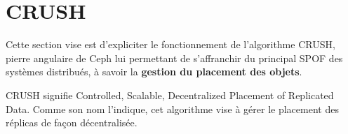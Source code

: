 \chapter{CRUSH}
\label{chap3:sec_crush}

Cette section vise est d'expliciter le fonctionnement de l'algorithme CRUSH, pierre angulaire de Ceph lui permettant de s'affranchir du principal SPOF des systèmes distribués, à savoir la \textbf{gestion du placement des objets}.

CRUSH signifie Controlled, Scalable, Decentralized Placement of Replicated Data. Comme son nom l'indique, cet algorithme vise à gérer le placement des réplicas de façon décentralisée.

    

